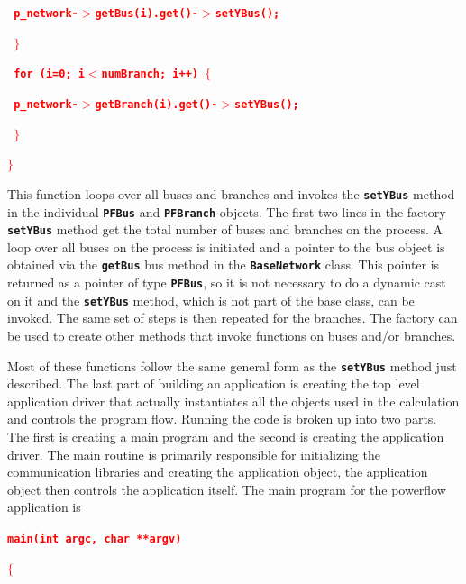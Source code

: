 \documentclass[12pt]{report} %
\begin{document}
\textcolor{red}{\texttt{\textbf{    p\_network-$\boldsymbol{\mathrm{>}}$getBus(i).get()-$\boldsymbol{\mathrm{>}}$setYBus();}}}

\textcolor{red}{\texttt{\textbf{  $\boldsymbol{\mathrm{\}}}$}}}

\textcolor{red}{\texttt{\textbf{  for (i=0; i$\boldsymbol{\mathrm{<}}$numBranch; i++) $\boldsymbol{\mathrm{\{}}$}}}

\textcolor{red}{\texttt{\textbf{    p\_network-$\boldsymbol{\mathrm{>}}$getBranch(i).get()-$\boldsymbol{\mathrm{>}}$setYBus();}}}

\textcolor{red}{\texttt{\textbf{  $\boldsymbol{\mathrm{\}}}$}}}

\textcolor{red}{\texttt{\textbf{$\boldsymbol{\mathrm{\}}}$}}}

This function loops over all buses and branches and invokes the \texttt{\textbf{setYBus}} method in the individual \texttt{\textbf{PFBus}} and \texttt{\textbf{PFBranch}} objects. The first two lines in the factory \texttt{\textbf{setYBus}} method get the total number of buses and branches on the process. A loop over all buses on the process is initiated and a pointer to the bus object is obtained via the \texttt{\textbf{getBus}} bus method in the \texttt{\textbf{BaseNetwork}} class. This pointer is returned as a pointer of type \texttt{\textbf{PFBus}}, so it is not necessary to do a dynamic cast on it and the \texttt{\textbf{setYBus}} method, which is not part of the base class, can be invoked. The same set of steps is then repeated for the branches. The factory can be used to create other methods that invoke functions on buses and/or branches. 

Most of these functions follow the same general form as the \texttt{\textbf{setYBus}} method just described.
The last part of building an application is creating the top level application driver that actually instantiates all the objects used in the calculation and controls the program flow. Running the code is broken up into two parts. The first is creating a main program and the second is creating the application driver. The main routine is primarily responsible for initializing the communication libraries and creating the application object, the application object then controls the application itself. The main program for the powerflow application is

\textcolor{red}{\texttt{\textbf{main(int argc, char **argv)}}}

\textcolor{red}{\texttt{\textbf{$\boldsymbol{\mathrm{\{}}$}}}
\end{document}
